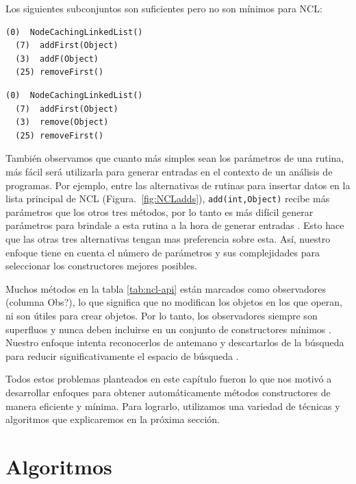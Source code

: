 Los siguientes subconjuntos son suficientes pero no son mínimos para NCL:
\\

\begin{lstlisting}[numbers=none,label=fig:NCLnoMin, frame=tb , basicstyle=\scriptsize]
  (0)  NodeCachingLinkedList()
  (7)  addFirst(Object)
  (3)  addF(Object)
  (25) removeFirst()
\end{lstlisting}

\begin{lstlisting}[numbers=none,label=fig:NCLnoMin1, caption= Conjuntos de metodos builders suficientes pero no mínimos, captionpos=b, frame=tb , basicstyle=\scriptsize]
  (0)  NodeCachingLinkedList()
  (7)  addFirst(Object)
  (3)  remove(Object)
  (25) removeFirst()
\end{lstlisting}

También observamos que cuanto más simples sean los parámetros de una rutina, más
fácil será utilizarla para generar entradas en el contexto de un análisis de
programas. Por ejemplo, entre las alternativas de rutinas para insertar datos en
la lista principal de NCL (Figura.~\ref{fig:NCLadds}), \texttt{add(int,Object)}
recibe más parámetros que los otros tres métodos, por lo tanto es más difícil
generar parámetros para brindale a esta rutina a la hora de generar entradas
. Esto hace que las otras tres alternativas tengan mas preferencia sobre esta. Así, nuestro enfoque tiene en cuenta el número de parámetros y sus complejidades para seleccionar los constructores mejores posibles.

Muchos métodos en la tabla \ref{tab:ncl-api} están marcados como observadores
(columna Obs?), lo que significa que no modifican los objetos en los que operan,
ni son útiles para crear objetos. Por lo tanto, los observadores siempre son
superfluos y nunca deben incluirse en un conjunto de constructores mínimos
. Nuestro enfoque intenta reconocerlos de antemano y
descartarlos de la búsqueda para reducir significativamente el espacio de
búsqueda .

Todos estos problemas planteados en este capítulo fueron lo que nos motivó a desarrollar enfoques para obtener automáticamente métodos constructores de manera eficiente y mínima. Para lograrlo, utilizamos una variedad de técnicas y algoritmos que explicaremos en la próxima sección. 


\section{Algoritmos}


